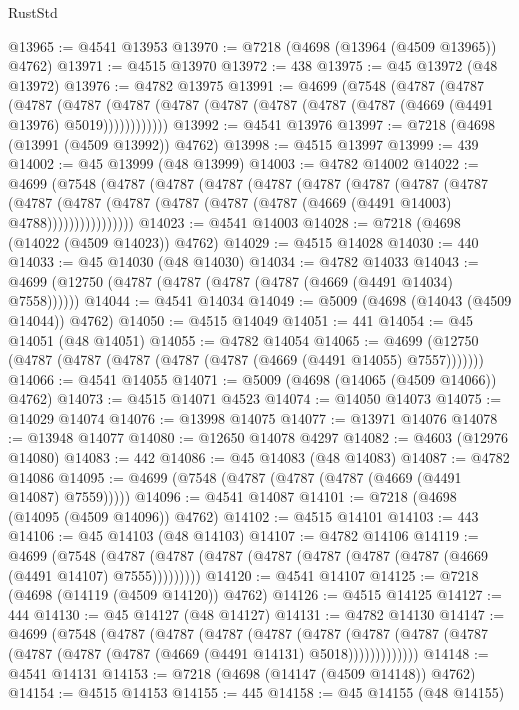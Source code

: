 \begin{lexlean}{RustStd}
\begin{coremodule}
@13965 := @4541 @13953
@13970 := @7218 (@4698 (@13964 (@4509 @13965)) @4762)
@13971 := @4515 @13970
@13972 := 438
@13975 := @45 @13972 (@48 @13972)
@13976 := @4782 @13975
@13991 := @4699
    (@7548
      (@4787
        (@4787
          (@4787
            (@4787 (@4787 (@4787 (@4787 (@4787 (@4787 (@4787 (@4669 (@4491 @13976) @5019))))))))))))
@13992 := @4541 @13976
@13997 := @7218 (@4698 (@13991 (@4509 @13992)) @4762)
@13998 := @4515 @13997
@13999 := 439
@14002 := @45 @13999 (@48 @13999)
@14003 := @4782 @14002
@14022 := @4699
    (@7548
      (@4787
        (@4787
          (@4787
            (@4787
              (@4787
                (@4787
                  (@4787
                    (@4787
                      (@4787
                        (@4787
                          (@4787 (@4787 (@4787 (@4787 (@4669 (@4491 @14003) @4788))))))))))))))))
@14023 := @4541 @14003
@14028 := @7218 (@4698 (@14022 (@4509 @14023)) @4762)
@14029 := @4515 @14028
@14030 := 440
@14033 := @45 @14030 (@48 @14030)
@14034 := @4782 @14033
@14043 := @4699 (@12750 (@4787 (@4787 (@4787 (@4787 (@4669 (@4491 @14034) @7558))))))
@14044 := @4541 @14034
@14049 := @5009 (@4698 (@14043 (@4509 @14044)) @4762)
@14050 := @4515 @14049
@14051 := 441
@14054 := @45 @14051 (@48 @14051)
@14055 := @4782 @14054
@14065 := @4699 (@12750 (@4787 (@4787 (@4787 (@4787 (@4787 (@4669 (@4491 @14055) @7557)))))))
@14066 := @4541 @14055
@14071 := @5009 (@4698 (@14065 (@4509 @14066)) @4762)
@14073 := @4515 @14071 @4523
@14074 := @14050 @14073
@14075 := @14029 @14074
@14076 := @13998 @14075
@14077 := @13971 @14076
@14078 := @13948 @14077
@14080 := @12650 @14078 @4297
@14082 := @4603 (@12976 @14080)
@14083 := 442
@14086 := @45 @14083 (@48 @14083)
@14087 := @4782 @14086
@14095 := @4699 (@7548 (@4787 (@4787 (@4787 (@4669 (@4491 @14087) @7559)))))
@14096 := @4541 @14087
@14101 := @7218 (@4698 (@14095 (@4509 @14096)) @4762)
@14102 := @4515 @14101
@14103 := 443
@14106 := @45 @14103 (@48 @14103)
@14107 := @4782 @14106
@14119 := @4699
    (@7548 (@4787 (@4787 (@4787 (@4787 (@4787 (@4787 (@4787 (@4669 (@4491 @14107) @7555)))))))))
@14120 := @4541 @14107
@14125 := @7218 (@4698 (@14119 (@4509 @14120)) @4762)
@14126 := @4515 @14125
@14127 := 444
@14130 := @45 @14127 (@48 @14127)
@14131 := @4782 @14130
@14147 := @4699
    (@7548
      (@4787
        (@4787
          (@4787
            (@4787
              (@4787
                (@4787 (@4787 (@4787 (@4787 (@4787 (@4787 (@4669 (@4491 @14131) @5018)))))))))))))
@14148 := @4541 @14131
@14153 := @7218 (@4698 (@14147 (@4509 @14148)) @4762)
@14154 := @4515 @14153
@14155 := 445
@14158 := @45 @14155 (@48 @14155)

\end{coremodule}
\end{lexlean}
